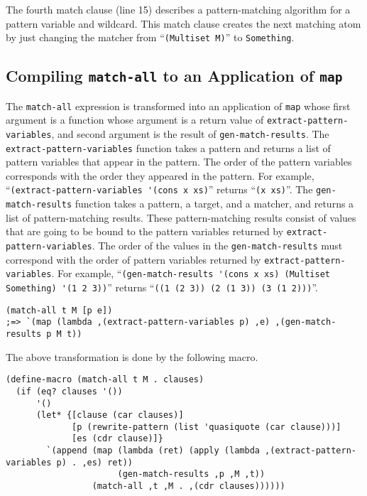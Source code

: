 \documentclass[acmlarge]{acmart}
\newcommand{\new}[1]{\textcolor{blue}{#1}}
\begin{document}
The fourth match clause (line 15) describes a pattern-matching algorithm for a pattern variable and wildcard.
This match clause creates the next matching atom by just changing the matcher from ``\lstinline{(Multiset M)}'' to \lstinline{Something}.

\subsection{Compiling \lstinline{match-all} to an Application of \lstinline{map}}\label{method-map}

The \lstinline{match-all} expression is transformed into an application of \lstinline{map} whose first argument is a function whose argument is a return value of \lstinline{extract-pattern-variables}, and second argument is the result of \lstinline{gen-match-results}.
The \lstinline{extract-pattern-variables} function takes a pattern and returns a list of pattern variables that appear in the pattern.
The order of the pattern variables corresponds with the order they appeared in the pattern.
For example, ``\lstinline{(extract-pattern-variables '(cons x xs)}'' returns ``\lstinline{(x xs)}''.
The \lstinline{gen-match-results} function takes a pattern, a target, and a matcher, and returns a list of pattern-matching results.
These pattern-matching results consist of values that are going to be bound to the pattern variables returned by \lstinline{extract-pattern-variables}.
The order of the values in the \lstinline{gen-match-results} must correspond with the order of pattern variables returned by \lstinline{extract-pattern-variables}.
For example, ``\lstinline{(gen-match-results '(cons x xs) (Multiset Something) '(1 2 3))}'' returns ``\lstinline{((1 (2 3)) (2 (1 3)) (3 (1 2)))}''.

\begin{lstlisting}[language=egison]
(match-all t M [p e])
;=> `(map (lambda ,(extract-pattern-variables p) ,e) ,(gen-match-results p M t))
\end{lstlisting}

\noindent The above transformation is done by the following macro.

\begin{lstlisting}[language=egison]
(define-macro (match-all t M . clauses)
  (if (eq? clauses '())
      '()
      (let* {[clause (car clauses)]
             [p (rewrite-pattern (list 'quasiquote (car clause)))]
             [es (cdr clause)]}
        `(append (map (lambda (ret) (apply (lambda ,(extract-pattern-variables p) . ,es) ret))
                      (gen-match-results ,p ,M ,t))
                 (match-all ,t ,M . ,(cdr clauses))))))
\end{lstlisting}
\end{document}
